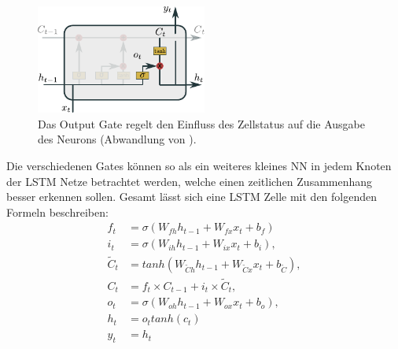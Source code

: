                 \begin{figure}[ht]
                    \centering
                    \includegraphics[width=0.5\textwidth]{images/Illustrationen/LSTM_OG}
                    \caption[Schematische Darstellung einer \ac{LSTM} Zelle - Input Gate]{Das Output Gate regelt den Einfluss des Zellstatus auf die Ausgabe des Neurons (Abwandlung von \cite{OLAH2015}).}
                    \label{fig:LSTM_Output}
                \end{figure}
            
                Die verschiedenen Gates können so als ein weiteres kleines NN in jedem Knoten der \ac{LSTM} Netze betrachtet werden, welche einen zeitlichen Zusammenhang besser erkennen sollen.
            Gesamt lässt sich eine \ac{LSTM} Zelle mit den folgenden Formeln beschreiben:
            \begin{equation}
                \begin{split}
                    f_t &= \sigma\left(W_{fh}h_{t-1} + W_{fx}x_t + b_f\right) \\
                    i_t &= \sigma\left(W_{ih}h_{t-1} + W_{ix}x_t + b_i\right), \\
                    \tilde{C}_t &= tanh\left(W_{\tilde{C}h}h_{t-1} + W_{\tilde{C}x}x_t + b_{\tilde{C}}\right),\\
                    C_t &=f_t\times C_{t-1} + i_t\times \tilde{C}_t, \\
                    o_t &= \sigma\left(W_{oh}h_{t-1} + W_{ox}x_t + b_o \right), \\
                    h_t &= o_ttanh\left(c_t\right) \\
                    y_t &= h_t
                \end{split}
            \end{equation}
